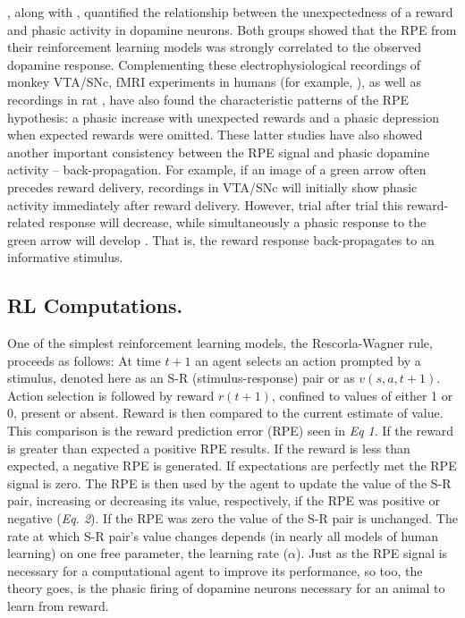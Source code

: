 \documentclass[doc,12pt]{apa}        %
\begin{document}
, along with , quantified the relationship between the unexpectedness of a reward and phasic activity in dopamine neurons.  Both groups showed that the RPE from their reinforcement learning models was strongly correlated to the observed dopamine response.  Complementing these electrophysiological recordings of monkey VTA/SNc, fMRI experiments in humans (for example, ), as well as recordings in rat \cite{Roesch:2007p2519}, have also found the characteristic patterns of the RPE hypothesis: a phasic increase with unexpected rewards and a phasic depression when expected rewards were omitted.  These latter studies have also showed another important consistency between the RPE signal and phasic dopamine activity -- back-propagation.  For example, if an image of a green arrow often precedes reward delivery, recordings in VTA/SNc will initially show phasic activity immediately after reward delivery.  However, trial after trial this reward-related response will decrease, while simultaneously a phasic response to the green arrow will develop \cite{Roesch:2007p2519}.  That is, the reward response back-propagates to an informative stimulus. 

\subsection{RL Computations.} %
\label{sub:rk_computations}

One of the simplest reinforcement learning models, the Rescorla-Wagner rule, proceeds as follows: At time $t+1$ an agent selects an action prompted by a stimulus, denoted here as an S-R (stimulus-response) pair or as $v(s,a,t+1)$. Action selection is followed by reward $r(t+1)$, confined to values of either 1 or 0, present or absent.  Reward is then compared to the current estimate of value.  This comparison is the reward prediction error (RPE) seen in \emph{Eq 1}.   If the reward is greater than expected a positive RPE results.  If the reward is less than expected, a negative RPE is generated.  If expectations are perfectly met the RPE signal is zero.  The RPE is then used by the agent to update the value of the S-R pair, increasing or decreasing its value, respectively, if the RPE was positive or negative (\emph{Eq. 2}).  If the RPE was zero the value of the S-R pair is unchanged.  The rate at which S-R pair's value changes depends (in nearly all models of human learning) on one free parameter, the learning rate ($\alpha$).  Just as the RPE signal is necessary for a computational agent to improve its performance, so too, the theory goes, is the phasic firing of dopamine neurons necessary for an animal to learn from reward.
\end{document}
